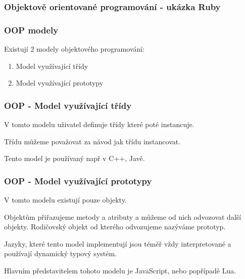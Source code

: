 \begin{frame}
    \frametitle{Objektově orientované programování - ukázka Ruby}


\end{frame}

\begin{frame}
    \frametitle{OOP modely}
        Existují 2 modely objektového programování:
        \begin{enumerate}
            \item Model využívající třídy
            \item Model využívající prototypy
        \end{enumerate} 
\end{frame}

\begin{frame}
    \frametitle{OOP - Model využívající třídy}
    V tomto modelu uživatel definuje třídy které poté instancuje.

    Třídu můžeme považovat za návod jak třídu instancovat.

    Tento model je používaný např v C++, Javě.
\end{frame}

\begin{frame}
    \frametitle{OOP - Model využívající prototypy}
    V tomto modelu existují pouze objekty. 

    Objektům přiřazujeme metody a atributy a můžeme od nich odvozovat další objekty. Rodičovský objekt od kterého odvozujeme nazýváme prototyp.

    Jazyky, které tento model implementují jsou téměř vždy interpretované a používají dynamický typový systém.

    Hlavním představitelem tohoto modelu je JavaScript, nebo popřípadě Lua.



\end{frame}

